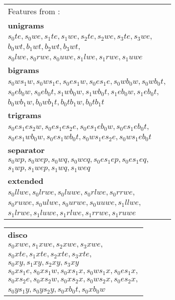 \documentclass[11pt,a4paper]{article}
\begin{document}
\begin{figure*}
\centering
\begin{adjustbox}{margin=3pt,frame}
\begin{tabular}{l}
{\footnotesize Features from \cite{zhang2009transition}:} \\
\textbf{unigrams} \\
$s_0te, s_0we, s_1te, s_1we, s_2te, s_2we, s_3te, s_3we,$ \\
$b_0wt, b_1wt, b_2wt, b_3wt,$ \\
$s_0lwe, s_0rwe, s_0uwe, s_1lwe, s_1rwe, s_1uwe$ \\
\textbf{bigrams} \\
$s_0ws_1w, s_0ws_1e, s_0es_1w, s_0es_1e, s_0wb_0w, s_0wb_0t,$ \\
$s_0eb_0w, s_0eb_0t, s_1wb_0w, s_1wb_0t, s_1eb_0w, s_1eb_0t,$ \\
$b_0wb_1w, b_0wb_1t, b_0tb_1w, b_0tb_1t$ \\
\textbf{trigrams} \\
$s_0es_1es_2w, s_0es_1es_2e, s_0es_1eb_0w, s_0es_1eb_0t,$ \\
$s_0es_1wb_0w, s_0es_1wb_0t, s_0ws_1es_2e, s_0ws_1eb_0t$ \\
\textbf{separator} \\
$s_0wp, s_0wep, s_0wq, s_0wcq, s_0es_1ep, s_0es_1eq,$ \\
$s_1wp, s_1wep, s_1wq, s_1weq$ \\

\textbf{extended} \footnotesize \cite{zhu2013fast} \\
$s_0llwe, s_0lrwe, s_0luwe, s_0rlwe, s_0rrwe,$ \\
$s_0ruwe, s_0ulwe, s_0urwe, s_0uuwe, s_1llwe,$ \\
$s_1lrwe, s_1luwe, s_1rlwe, s_1rrwe, s_1ruwe$ \\
\end{tabular}
\begin{tabular}{l}
\textbf{disco} \footnotesize \cite{maier2015discontinuous} \\
$s_0xwe, s_1xwe, s_2xwe, s_3xwe,$ \\
$s_0xte, s_1xte, s_2xte, s_3xte,$ \\
$s_0xy, s_1xy, s_2xy, s_3xy$ \\
$s_0xs_1e, s_0xs_1w, s_0xs_1x, s_0ws_1x, s_0es_1x,$ \\
$s_0xs_2e, s_0xs_2w, s_0xs_2x, s_0ws_2x, s_0es_2x,$ \\
$s_0ys_1y, s_0ys_2y, s_0xb_0t, s_0xb_0w$ \\


\end{tabular}
\end{adjustbox}
\end{figure*}
\end{document}
